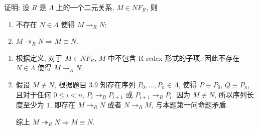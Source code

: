 \begin{problem}
证明: 设 $R$ 是 $\Lambda$ 上的一个二元关系, $M \in NF_R$, 则
\begin{enumerate}
\item 不存在 $N \in \Lambda$ 使得 $M \to_R N$;
\item $M \twoheadrightarrow_R N \Rightarrow M \equiv N$.
\end{enumerate}
\end{problem}

\begin{solution}
\begin{enumerate}
\item 根据定义, 对于 $M \in NF_R$, $M$ 中不包含 R-redex 形式的子项, 因此不存在 $N \in \Lambda$ 使得 $M \to_R N$.
\item 假设 $M \not\equiv N$, 根据题目 3.9 知存在序列 $P_0, \dots, P_n \in \Lambda$, 使得 $P \equiv P_0$, $Q \equiv P_n$, 且对于任何 $0 \le i < n$, $P_i \to_R P_{i+1}$ 或 $P_{i+1} \to_R P_{i}$. 因为 $M \not\equiv N$, 所以序列长度至少为 $1$, 即存在 $M \to_R N$ 或者 $N \to_R M$, 与本题第一问命题矛盾.

综上 $M \twoheadrightarrow_R N \Rightarrow M \equiv N$.
\end{enumerate}
\end{solution}
